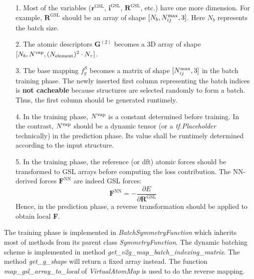 \documentclass[preprint]{revtex4-2}
\begin{document}
\begin{itemize}
    
    \item[1.] 
    Most of the variables ($\mathbf{r}^{\mathrm{GSL}}$, 
    $\mathbf{i}^{\mathrm{GSL}}$, $\mathbf{R}^{\mathrm{GSL}}$, etc.) have one 
    more dimension. For example, $\mathbf{R}^{\mathrm{GSL}}$ should be an array
    of shape $[N_b, N_{ij}^{\mathrm{max}}, 3]$. Here $N_{b}$ represents the batch size.

    \item[2.]
    The atomic descriptors $\mathbf{G}^{(2)}$ becomes a 3D array of shape 
    $[N_b, N^{\mathrm{vap}}, (N_{\mathrm{element}})^2 \cdot N_{\tau}]$.

    \item[3.] 
    The base mapping $f_{g}^{S}$ becomes a matrix of shape $[N_{ij}^{\mathrm{max}}, 3]$ in the 
    batch training phase. The newly inserted first column 
    \textemdash representing the batch indices \textemdash is 
    \textbf{not cacheable} because structures are selected randomly to form a 
    batch. Thus, the first column should be generated runtimely.

    \item[4.]
    In the training phase, $N^{\mathrm{vap}}$ is a constant determined before training. In 
    the contrast, $N^{\mathrm{vap}}$ should be a dynamic tensor 
    (or a \textit{tf.Placeholder} technically) in the prediction phase.
    Its value shall be runtimely determined according to the input structure. 

    \item[5.]
    In the training phase, the reference (or dft) atomic forces should be 
    transformed to GSL arrays before computing the loss contribution. The 
    NN-derived forces $\mathbf{F}^{\mathrm{NN}}$ are indeed GSL forces:
    \begin{equation}
        \mathbf{F}^{\mathrm{NN}} = 
        -\frac{\partial{E}}{\partial{\mathbf{R}^{\mathrm{GSL}}}}
    \end{equation}
    Hence, in the prediction phase, a reverse transformation should be applied 
    to obtain local \textbf{F}.

\end{itemize}

The training phase is implemented in \textit{BatchSymmetryFunction} which 
inherits most of methods from its parent class \textit{SymmetryFunction}. 
The dynamic batching scheme is implemented in method 
\textit{get\_v2g\_map\_batch\_indexing\_matrix}. The method 
\textit{get\_g\_shape} will return a fixed array instead. The function
\textit{map\_gsl\_array\_to\_local} of \textit{VirtualAtomMap} is used to do the 
reverse mapping.
\end{document}
